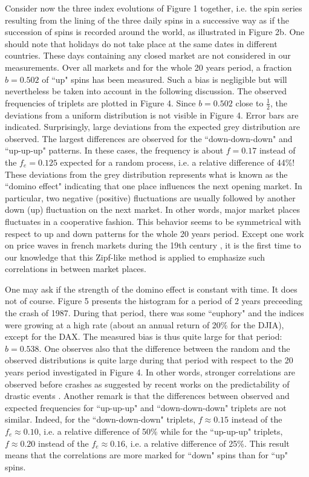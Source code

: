 \documentclass[12pt]{article}
\begin{document}
Consider now the three index evolutions of Figure 1 together, i.e. the spin series resulting from the lining of the three daily spins in a successive way as if the succession of spins is recorded around the world, as illustrated in Figure 2b. One should note that holidays do not take place at the same dates in different countries. These days containing any closed market are not considered in our measurements. Over all markets and for the whole 20 years period, a fraction $b=0.502$ of ``up" spins has been measured. Such a bias is negligible but will nevertheless be taken into account in the following discussion. The observed frequencies of triplets are plotted in Figure 4. Since $b=0.502$ close to $\frac{1}{2}$, the deviations from a uniform distribution is not visible in Figure 4. Error bars are indicated. Surprisingly, large deviations from the expected grey distribution are observed. The largest differences are observed for the ``down-down-down" and ``up-up-up" patterns. In these cases, the frequency is about $f=0.17$ instead of the $f_e=0.125$ expected for a random process, i.e. a relative difference of 44\%! These deviations from the grey distribution represents what is known as the ``domino effect" indicating that one place influences the next opening market. In particular, two negative (positive) fluctuations are usually followed by another down (up) fluctuation on the next market. In other words, major market places fluctuates in a cooperative fashion. This behavior seems to be symmetrical with respect to up and down patterns for the whole 20 years period. Except one work on price waves in french markets during the 19th century \cite{wave}, it is the first time to our knowledge that this Zipf-like method is applied to emphasize such correlations in between market places. 

One may ask if the strength of the domino effect is constant with time. It does not of course. Figure 5 presents the histogram for a period of 2 years preceeding the crash of 1987. During that period, there was some ``euphory" and the indices were growing at a high rate (about an annual return of 20\% for the DJIA), except for the DAX. The measured bias is thus quite large for that period: $b=0.538$. One observes also that the difference between the random and the observed distributions is quite large during that period with respect to the 20 years period investigated in Figure 4. In other words, stronger correlations are observed before crashes as suggested by recent works on the predictability of drastic events \cite{crash,sornette}. Another remark is that the differences between observed and expected frequencies for ``up-up-up" and ``down-down-down" triplets are not similar. Indeed, for the ``down-down-down" triplets, $f \approx 0.15$ instead of the $f_e \approx 0.10$, i.e. a relative difference of 50\% while for the ``up-up-up" triplets, $f \approx 0.20$ instead of the $f_e \approx 0.16$, i.e. a relative difference of 25\%. This result means that the correlations are more marked for ``down" spins than for ``up" spins.
\end{document}
